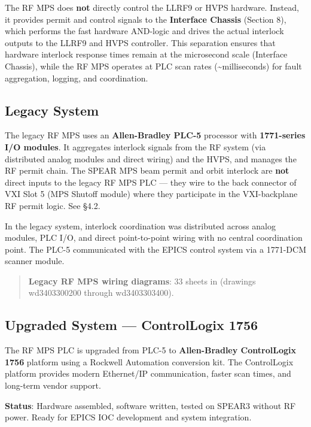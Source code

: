 The RF MPS does \textbf{not} directly control the LLRF9 or HVPS hardware. Instead, it provides permit and control signals to the \textbf{Interface Chassis} (Section 8), which performs the fast hardware AND-logic and drives the actual interlock outputs to the LLRF9 and HVPS controller. This separation ensures that hardware interlock response times remain at the microsecond scale (Interface Chassis), while the RF MPS operates at PLC scan rates (\textasciitilde milliseconds) for fault aggregation, logging, and coordination.

\subsection{Legacy System}\label{legacy-system-1}

The legacy RF MPS uses an \textbf{Allen-Bradley PLC-5} processor with \textbf{1771-series I/O modules}. It aggregates interlock signals from the RF system (via distributed analog modules and direct wiring) and the HVPS, and manages the RF permit chain. The SPEAR MPS beam permit and orbit interlock are \textbf{not} direct inputs to the legacy RF MPS PLC --- they wire to the back connector of VXI Slot 5 (MPS Shutoff module) where they participate in the VXI-backplane RF permit logic. See  §4.2.

In the legacy system, interlock coordination was distributed across analog modules, PLC I/O, and direct point-to-point wiring with no central coordination point. The PLC-5 communicated with the EPICS control system via a 1771-DCM scanner module.

\begin{quote}
\textbf{Legacy RF MPS wiring diagrams}: 33 sheets in  (drawings wd3403300200 through wd3403303400).
\end{quote}

\subsection{Upgraded System --- ControlLogix 1756}\label{upgraded-system-controllogix-1756}

The RF MPS PLC is upgraded from PLC-5 to \textbf{Allen-Bradley ControlLogix 1756} platform using a Rockwell Automation conversion kit. The ControlLogix platform provides modern Ethernet/IP communication, faster scan times, and long-term vendor support.

\textbf{Status}: Hardware assembled, software written, tested on SPEAR3 without RF power. Ready for EPICS IOC development and system integration.


